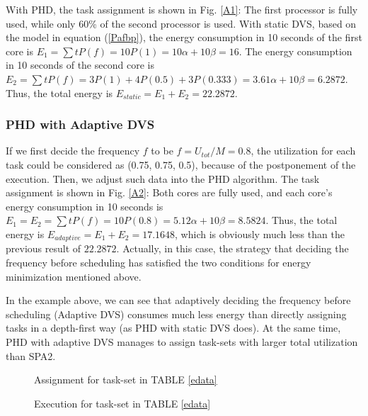 \documentclass[12pt, journal,compsoc]{IEEEtran}
\begin{document}
With PHD, the task assignment is shown in Fig. \ref{A1}: The first processor is fully used, while only 60\% of the second processor is used. With static DVS, based on the model in equation (\ref{Pafbp}), the energy consumption in 10 seconds of the first core is $E_1 = \sum t P(f) = 10 P(1) = 10 \alpha + 10 \beta = 16$. The energy consumption in 10 seconds of the second core is $E_2 = \sum t P(f) = 3 P(1) + 4 P(0.5) + 3 P(0.333) = 3.61 \alpha + 10 \beta = 6.2872$. Thus, the total energy is $E_{static} = E_1 + E_2 = 22.2872$.

\subsubsection{PHD with Adaptive DVS}

If we first decide the frequency $f$ to be $f = U_{tot} / M = 0.8$, the utilization for each task could be considered as (0.75, 0.75, 0.5), because of the postponement of the execution. Then, we adjust such data into the PHD algorithm. The task assignment is shown in Fig. \ref{A2}: Both cores are fully used, and each core's energy consumption in 10 seconds is $E_1 = E_2 = \sum t P(f) = 10 P(0.8) = 5.12 \alpha + 10 \beta = 8.5824$. Thus, the total energy is $E_{adaptive} = E_1 + E_2 = 17.1648$, which is obviously much less than the previous result of $22.2872$. Actually, in this case, the strategy that deciding the frequency before scheduling has satisfied the two conditions for energy minimization mentioned above.


\vspace{0.1in}

In the example above, we can see that adaptively deciding the frequency before scheduling (Adaptive DVS) consumes much less energy than directly assigning tasks in a depth-first way (as PHD with static DVS does). At the same time, PHD with adaptive DVS manages to assign task-sets with larger total utilization than SPA2.

\begin{figure}[!t]
\centering
{}
\hspace{-0.1in}
\caption{Assignment for task-set in TABLE \ref{edata}}
\end{figure}


\begin{figure}[!t]
\centering
{}
\caption{Execution for task-set in TABLE \ref{edata}}
\end{figure}
\end{document}
